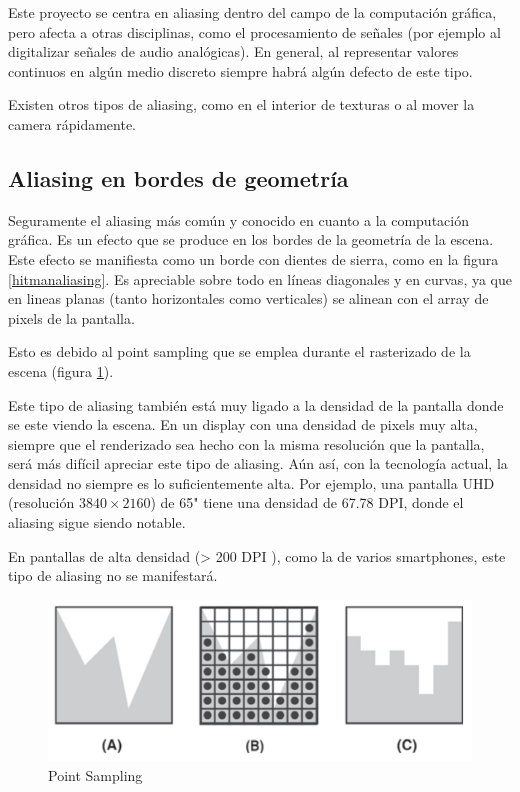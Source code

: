 \documentclass[withindex, glossary]{cam-thesis}
\begin{document}
Este proyecto se centra en aliasing dentro del campo de la computación gráfica, pero afecta a otras disciplinas, como el procesamiento de señales (por ejemplo al digitalizar señales de audio analógicas). En general, al representar valores continuos en algún medio discreto siempre habrá algún defecto de este tipo\cite{Mitchell:1988:RFC:378456.378514}.

Existen otros tipos de aliasing, como en el interior de texturas o al mover la camera rápidamente.

\subsection{Aliasing en bordes de geometría}

Seguramente el aliasing más común y conocido en cuanto a la computación gráfica. Es un efecto que se produce en los bordes de la geometría de la escena. Este efecto se manifiesta como un borde con dientes de sierra, como en la figura \ref{hitmanaliasing}. Es apreciable sobre todo en líneas diagonales y en curvas, ya que en lineas planas (tanto horizontales como verticales) se alinean con el array de pixels de la pantalla.

Esto es debido al point sampling que se emplea durante el rasterizado de la escena (figura \ref{pointsampling}).

Este tipo de aliasing también está muy ligado a la densidad de la pantalla donde se este viendo la escena. En un display con una densidad de pixels muy alta, siempre que el renderizado sea hecho con la misma resolución que la pantalla, será más difícil apreciar este tipo de aliasing. Aún así, con la tecnología actual, la densidad no siempre es lo suficientemente alta. Por ejemplo, una pantalla UHD (resolución $3840 \times 2160$) de 65" tiene una densidad de 67.78 DPI, donde el aliasing sigue siendo notable.

En pantallas de alta densidad (> 200 DPI \cite{googledpi}), como la de varios smartphones, este tipo de aliasing no se manifestará.

\begin{figure}[!htbp]
    \includegraphics[width=.7\linewidth]{figures/pointsampling.png}
    \caption{Point Sampling\cite{Shreiner:2013:OPG:2544032}}
    \label{pointsampling}
\end{figure}
\end{document}
